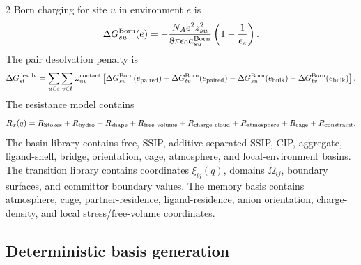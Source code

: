 \documentclass[10pt]{article}
\begin{document}
\begin{multicols}{2}
Born charging for site \(u\) in environment \(e\) is
\[
\Delta G_{su}^{\rm Born}(e)
=
-\frac{N_Ae^2z_{su}^2}
{8\pi\epsilon_0a_{su}^{\rm Born}}
\left(1-\frac{1}{\epsilon_e}\right).
\]
The pair desolvation penalty is
\[
\Delta G_{st}^{\rm desolv}
=
\sum_{u\in s}\sum_{v\in t}
\omega_{uv}^{\rm contact}
\left[
\Delta G_{su}^{\rm Born}(e_{\rm paired})
+\Delta G_{tv}^{\rm Born}(e_{\rm paired})
-\Delta G_{su}^{\rm Born}(e_{\rm bulk})
-\Delta G_{tv}^{\rm Born}(e_{\rm bulk})
\right].
\]
The resistance model contains
\[
R_x(q)=
R_{\rm Stokes}
+R_{\rm hydro}
+R_{\rm shape}
+R_{\rm free\ volume}
+R_{\rm charge\ cloud}
+R_{\rm atmosphere}
+R_{\rm cage}
+R_{\rm constraint}.
\]
The basin library contains free, SSIP, additive-separated SSIP, CIP, aggregate,
ligand-shell, bridge, orientation, cage, atmosphere, and local-environment
basins. The transition library contains coordinates \(\xi_{ij}(q)\), domains
\(\Omega_{ij}\), boundary surfaces, and committor boundary values. The memory
basis contains atmosphere, cage, partner-residence, ligand-residence, anion
orientation, charge-density, and local stress/free-volume coordinates.

\subsection{Deterministic basis generation}


\end{multicols}
\end{document}
